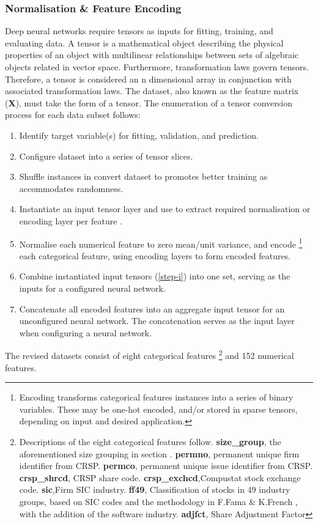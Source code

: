 \documentclass[12pt]{article}
\begin{document}
\subsubsection{Normalisation \& Feature Encoding}
Deep neural networks require tensors as inputs for fitting, training, and evaluating data.
A tensor is a mathematical object describing the physical properties of an object with multilinear relationships between sets of algebraic objects related in vector space.
Furthermore, transformation laws govern tensors.
Therefore, a tensor is considered an n dimensional array in conjunction with associated transformation laws.
The dataset, also known as the feature matrix (\textbf{X}), must take the form of a tensor.
The enumeration of a tensor conversion process for each data subset follows:
\singlespacing
\begin{enumerate}
	\item Identify target variable(s) for fitting, validation, and prediction.
	\item Configure dataset into a series of tensor slices.
	\item Shuffle instances in convert dataset to promotes better training as accommodates randomness.
	\item Instantiate an input tensor layer and use to extract required normalisation or encoding layer per feature \label{step-i}.
	\item Normalise each numerical feature to zero mean/unit variance, and encode
	      \footnote{Encoding transforms categorical features instances into a series of binary variables.
		      These may be one-hot encoded, and/or stored in sparse tensors, depending on input and desired application.}
	      each categorical feature, using encoding layers to form encoded features.
	\item Combine instantiated input tensors (\ref{step-i}) into one set, serving as the inputs for a configured neural network.
	\item Concatenate all encoded features into an aggregate input tensor for an unconfigured neural network.
	      The concatenation serves as the input layer when configuring a neural network.
\end{enumerate}
\doublespacing
The revised datasets consist of eight categorical features
\footnote{Descriptions of the eight categorical features follow.
	\textbf{size\_group}, the aforementioned size grouping in section \label{data-processing}.
	\textbf{permno}, permanent unique firm identifier from CRSP.
	\textbf{permco}, permanent unique issue identifier from CRSP.
	\textbf{crsp\_shrcd}, CRSP share code.
	\textbf{crsp\_exchcd},Compustat stock exchange code.
	\textbf{sic},Firm SIC industry.
	\textbf{ff49}, Classification of stocks in 49 industry groups, based on SIC codes and the methodology in F.Fama \& K.French \citeyear{fama1997industry}, with the addition of the software industry.
	\textbf{adjfct}, Share Adjustment Factor}
and 152 numerical features.
\end{document}
